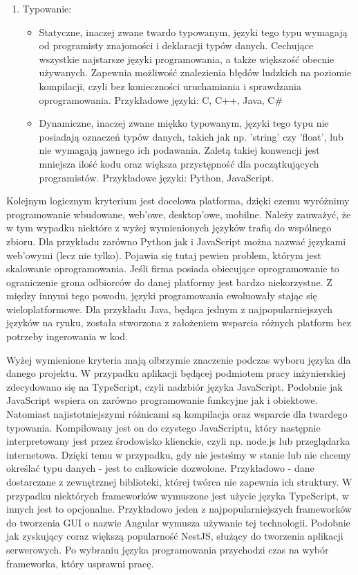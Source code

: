 \documentclass[skorowidz,skroty]{dyplomWEZUT}
\begin{document}
\begin{enumerate}
\item Typowanie:
\begin{itemize}
	\item Statyczne, inaczej zwane twardo typowanym, języki tego typu wymagają od programisty znajomości i deklaracji typów danych. Cechujące wszystkie najstarsze 
	 języki programowania, a także większość obecnie używanych. Zapewnia możliwość znalezienia błędów ludzkich na poziomie kompilacji, czyli bez konieczności uruchamiania i sprawdzania oprogramowania. Przykładowe języki: C, C++, Java, C\#
	 \item Dynamiczne, inaczej zwane miękko typowanym, języki tego typu nie posiadają oznaczeń typów danych, takich jak np. 'string' czy 'float', lub nie wymagają jawnego ich podawania. Zaletą takiej konwencji jest mniejsza ilość kodu oraz większa przystępność dla początkujących programistów. Przykładowe języki: Python, JavaScript. 

\end{itemize}

\end{enumerate} 
Kolejnym logicznym kryterium jest docelowa platforma, dzięki czemu wyróżnimy programowanie wbudowane, web'owe, desktop'owe, mobilne. Należy zauważyć, że w tym wypadku niektóre z wyżej wymienionych języków trafią do wspólnego zbioru. Dla przykładu zarówno Python jak i JavaScript można nazwać językami web'owymi (lecz nie tylko). Pojawia się tutaj pewien problem, którym jest skalowanie oprogramowania. Jeśli firma posiada obiecujące oprogramowanie to ograniczenie grona odbiorców do danej platformy jest bardzo niekorzystne. Z między innymi tego powodu, języki programowania ewoluowały stając się wieloplatformowe. Dla przykładu Java, będąca jednym z najpopularniejszych języków na rynku, została stworzona z założeniem wsparcia różnych platform bez potrzeby ingerowania w kod. 

Wyżej wymienione kryteria mają olbrzymie znaczenie podczas wyboru języka dla danego projektu. W przypadku aplikacji będącej podmiotem pracy inżynierskiej zdecydowano się na TypeScript, czyli nadzbiór języka JavaScript. Podobnie jak JavaScript wspiera on zarówno programowanie funkcyjne jak i obiektowe. Natomiast najistotniejszymi różnicami są kompilacja oraz wsparcie dla twardego typowania. Kompilowany jest on do czystego JavaScriptu, który następnie interpretowany jest przez środowisko klienckie, czyli np. node.js lub przeglądarka internetowa. Dzięki temu w przypadku, gdy nie jesteśmy w stanie lub nie chcemy określać typu danych - jest to całkowicie dozwolone. Przykładowo - dane dostarczane z zewnętrznej biblioteki, której twórca nie zapewnia ich struktury. W przypadku niektórych frameworków wymuszone jest użycie języka TypeScript, w innych jest to opcjonalne. Przykładowo jeden z najpopularniejszych frameworków do tworzenia GUI o nazwie Angular wymusza używanie tej technologii. Podobnie jak zyskujący coraz większą popularność NestJS, służący do tworzenia aplikacji serwerowych. Po wybraniu języka programowania przychodzi czas na wybór frameworka, który usprawni pracę.
\end{document}
